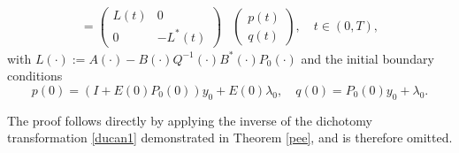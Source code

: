 \documentclass{IEEEtran}
\begin{document}
\begin{theorem}
\begin{equation*}
\begin{split}
				=
				\begin{pmatrix}
					L(t) & 0 \\
					0 & -L^*(t)
				\end{pmatrix}
				&
				\begin{pmatrix}p(t)\\ q(t)\end{pmatrix},\quad t\in(0,T),
			\end{split}
		\end{equation*}
		with $L(\cdot):=A(\cdot)-B(\cdot)Q^{-1}(\cdot)B^*(\cdot)P_0(\cdot)$ and the initial boundary conditions $$p(0)=(I+E(0)P_0(0))y_0 + E(0)\lambda_0,\quad q(0)=P_0(0)y_0+\lambda_0.$$
	\end{theorem}The proof follows directly by applying the inverse of the dichotomy transformation \eqref{ducan1} demonstrated in Theorem \ref{pee}, and is therefore omitted.
	
	
	
	
	
	

	
	
	
	
	
	
	
	
	
	
	
	
	
	
	
	
	
	
\end{document}
